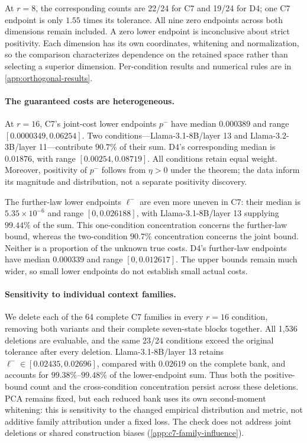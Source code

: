 At $r=8$, the corresponding counts are 22/24 for C7 and 19/24 for D4; one C7 endpoint is only $1.55$ times its tolerance. All nine zero endpoints across both dimensions remain included. A zero lower endpoint is inconclusive about strict positivity. Each dimension has its own coordinates, whitening and normalization, so the comparison characterizes dependence on the retained space rather than selecting a superior dimension. Per-condition results and numerical rules are in \cref{app:orthogonal-results}.

\paragraph{The guaranteed costs are heterogeneous.}
At $r=16$, C7's joint-cost lower endpoints $p^-$ have median $0.000389$ and range $[0.0000349,0.06254]$. Two conditions---Llama-3.1-8B/layer 13 and Llama-3.2-3B/layer 11---contribute $90.7\%$ of their sum. D4's corresponding median is $0.01876$, with range $[0.00254,0.08719]$. All conditions retain equal weight. Moreover, positivity of $p^-$ follows from $\eta>0$ under the theorem; the data inform its magnitude and distribution, not a separate positivity discovery.

The further-law lower endpoints $\ell^-$ are even more uneven in C7: their median is $5.35\times10^{-6}$ and range $[0,0.026188]$, with Llama-3.1-8B/layer 13 supplying $99.44\%$ of the sum. This one-condition concentration concerns the further-law bound, whereas the two-condition $90.7\%$ concentration concerns the joint bound. Neither is a proportion of the unknown true costs. D4's further-law endpoints have median $0.000339$ and range $[0,0.012617]$. The upper bounds remain much wider, so small lower endpoints do not establish small actual costs.

\paragraph{Sensitivity to individual context families.}
We delete each of the 64 complete C7 families in every $r=16$ condition, removing both variants and their complete seven-state blocks together. All 1,536 deletions are evaluable, and the same 23/24 conditions exceed the original tolerance after every deletion. Llama-3.1-8B/layer 13 retains $\ell^-\in[0.02435,0.02696]$, compared with $0.02619$ on the complete bank, and accounts for $99.38\%$--$99.48\%$ of the lower-endpoint sum. Thus both the positive-bound count and the cross-condition concentration persist across these deletions. PCA remains fixed, but each reduced bank uses its own second-moment whitening: this is sensitivity to the changed empirical distribution and metric, not additive family attribution under a fixed loss. The check does not address joint deletions or shared construction biases (\cref{app:c7-family-influence}).

